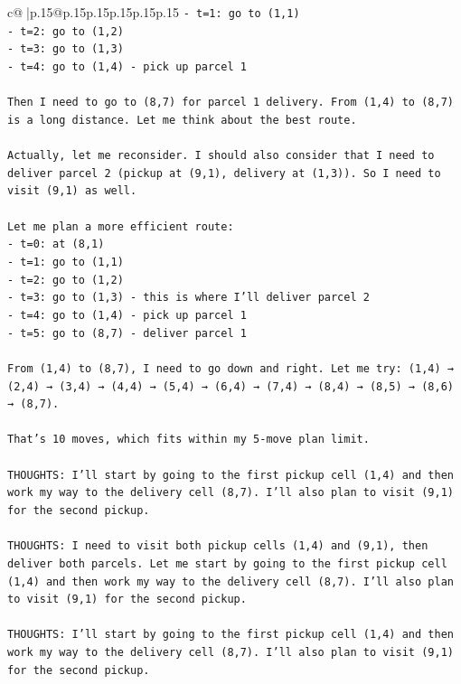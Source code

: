 \documentclass{article}
\begin{document}
{\begin{supertabular}{c@{$\;$}|p{.15\linewidth}@{}p{.15\linewidth}p{.15\linewidth}p{.15\linewidth}p{.15\linewidth}p{.15\linewidth}}
{{{\texttt{{-} t=1: go to (1,1)} \\
\texttt{{-} t=2: go to (1,2)} \\
\texttt{{-} t=3: go to (1,3)} \\
\texttt{{-} t=4: go to (1,4) {-} pick up parcel 1} \\
\\ 
\texttt{Then I need to go to (8,7) for parcel 1 delivery. From (1,4) to (8,7) is a long distance. Let me think about the best route.} \\
\\ 
\texttt{Actually, let me reconsider. I should also consider that I need to deliver parcel 2 (pickup at (9,1), delivery at (1,3)). So I need to visit (9,1) as well.} \\
\\ 
\texttt{Let me plan a more efficient route:} \\
\texttt{{-} t=0: at (8,1)} \\
\texttt{{-} t=1: go to (1,1)} \\
\texttt{{-} t=2: go to (1,2)} \\
\texttt{{-} t=3: go to (1,3) {-} this is where I'll deliver parcel 2} \\
\texttt{{-} t=4: go to (1,4) {-} pick up parcel 1} \\
\texttt{{-} t=5: go to (8,7) {-} deliver parcel 1} \\
\\ 
\texttt{From (1,4) to (8,7), I need to go down and right. Let me try: (1,4) → (2,4) → (3,4) → (4,4) → (5,4) → (6,4) → (7,4) → (8,4) → (8,5) → (8,6) → (8,7).} \\
\\ 
\texttt{That's 10 moves, which fits within my 5{-}move plan limit.} \\
\\ 
\texttt{THOUGHTS: I'll start by going to the first pickup cell (1,4) and then work my way to the delivery cell (8,7). I'll also plan to visit (9,1) for the second pickup.} \\
\\ 
\texttt{THOUGHTS: I need to visit both pickup cells (1,4) and (9,1), then deliver both parcels. Let me start by going to the first pickup cell (1,4) and then work my way to the delivery cell (8,7). I'll also plan to visit (9,1) for the second pickup.} \\
\\ 
\texttt{THOUGHTS: I'll start by going to the first pickup cell (1,4) and then work my way to the delivery cell (8,7). I'll also plan to visit (9,1) for the second pickup.} \\
}}}
\end{supertabular}}
\end{document}
